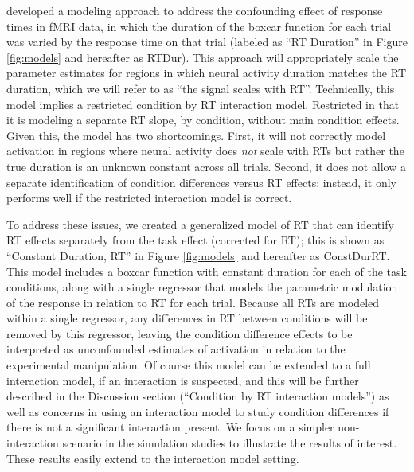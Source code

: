 \documentclass[titlepage,12pt] {article}
\begin{document}
\citet{grinband_detection_2008} developed a modeling approach to address the confounding effect of response times in fMRI data, in which the duration of the boxcar function for each trial was varied by the response time on that trial (labeled as ``RT Duration'' in Figure \ref{fig:models} and hereafter as RTDur).  This approach will appropriately scale the parameter estimates for regions in which neural activity duration matches the RT duration, which we will refer to as ``the signal scales with RT''.  Technically, this model implies a restricted condition by RT interaction model. Restricted in that it is modeling a separate RT slope, by condition, without main condition effects.   Given this, the model has two shortcomings. First, it will not correctly model activation in regions where neural activity does \textit{not} scale with RTs but rather the true duration is an unknown constant across all trials.  Second, it does not allow a separate identification of condition differences versus RT effects; instead, it only performs well if the restricted interaction model is correct.  

To address these issues, we created a generalized model of RT that can identify RT effects separately from the task effect (corrected for RT); this is shown as ``Constant Duration, RT'' in Figure \ref{fig:models} and hereafter as ConstDurRT.  This model includes a boxcar function with constant duration for each of the task conditions, along with a single regressor that models the parametric modulation of the response in relation to RT for each trial. Because all RTs are modeled within a single regressor, any differences in RT between conditions will be removed by this regressor, leaving the condition difference effects to be interpreted as unconfounded estimates of activation in relation to the experimental manipulation.  Of course this model can be extended to a full interaction model, if an interaction is suspected, and this will be further described in the Discussion section (``Condition by RT interaction models'') as well as concerns in using an interaction model to study condition differences if there is not a significant interaction present.  We focus on a simpler non-interaction scenario in the simulation studies to illustrate the results of interest.  These results easily extend to the interaction model setting.
\end{document}
